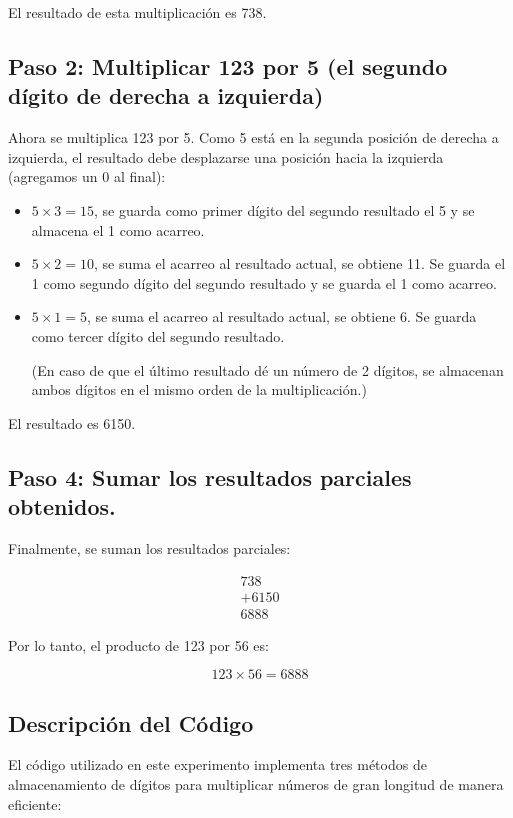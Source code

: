 \documentclass[10pt]{article}
\begin{document}
El resultado de esta multiplicación es 738.

\subsection*{Paso 2: Multiplicar 123 por 5 (el segundo dígito de derecha a izquierda)}

Ahora se multiplica 123 por 5. Como 5 está en la segunda posición de derecha a izquierda, el resultado debe desplazarse una posición hacia la izquierda (agregamos un 0 al final):

\begin{itemize}
    \item $5 \times 3 = 15$, se guarda como primer dígito del segundo resultado el 5 y se almacena el 1 como acarreo.
    \item $5 \times 2 = 10$, se suma el acarreo al resultado actual, se obtiene 11. Se guarda el 1 como segundo dígito del segundo resultado y se guarda el 1 como acarreo.
    \item $5 \times 1 = 5$, se suma el acarreo al resultado actual, se obtiene 6. Se guarda como tercer dígito del segundo resultado.

    (En caso de que el último resultado dé un número de 2 dígitos, se almacenan ambos dígitos en el mismo orden de la multiplicación.)
\end{itemize}

El resultado es 6150.

\subsection*{Paso 4: Sumar los resultados parciales obtenidos.}

Finalmente, se suman los resultados parciales:

\[
\begin{array}{r}
     738 \\
    + 6150 \\
  \hline
      6888
\end{array}
\]

Por lo tanto, el producto de 123 por 56 es:

\[
123 \times 56 = 6888
\]

\subsection{Descripción del Código}

El código utilizado en este experimento implementa tres métodos de almacenamiento de dígitos para multiplicar números de gran longitud de manera eficiente:
\end{document}
